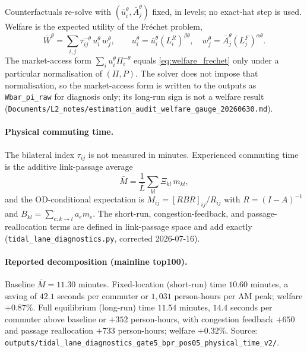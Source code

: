 \documentclass[11pt]{article}
\newcommand{\Lbar}{\bar L}
\newcommand{\Wbar}{\bar W}
\newcommand{\ubar}{\bar u}
\newcommand{\Abar}{\bar A}
\begin{document}
Counterfactuals re-solve with $(\ubar_i^{\theta},\Abar_j^{\theta})$
fixed, in levels; no exact-hat step is used.  Welfare is the expected
utility of the Fr\'echet problem,
\begin{equation}\label{eq:welfare_frechet}
  \Wbar^{\theta} = \sum_{i,j}\tau_{ij}^{-\theta}\,u_i^{\theta}\,w_j^{\theta},
  \qquad
  u_i^{\theta} = \ubar_i^{\theta}(L_i^R)^{\beta\theta},\quad
  w_j^{\theta} = \Abar_j^{\theta}(L_j^F)^{\alpha\theta}.
\end{equation}
The market-access form $\sum_i u_i^{\theta}\Pi_i^{-\theta}$ equals
\eqref{eq:welfare_frechet} only under a particular normalisation of
$(\Pi,P)$. The solver does not impose that normalisation, so the
market-access form is written to the outputs as \texttt{Wbar\_pi\_raw} for
diagnosis only; its long-run sign is not a welfare result
(\texttt{Documents/L2\_notes/estimation\_audit\_welfare\_gauge\_20260630.md}).

\paragraph{Physical commuting time.}
The bilateral index $\tau_{ij}$ is not measured in minutes. Experienced
commuting time is the additive link-passage average
\begin{equation}\label{eq:Mbar}
  \bar M = \frac{1}{\Lbar}\sum_{kl}\Xi_{kl}\,m_{kl},
\end{equation}
and the OD-conditional expectation is $M_{ij}=[RBR]_{ij}/R_{ij}$ with
$R=(I-A)^{-1}$ and $B_{kl}=\sum_{e:k\to l}a_e m_e$. The short-run,
congestion-feedback, and passage-reallocation terms are defined in
link-passage space and add exactly (\texttt{tidal\_lane\_diagnostics.py},
corrected 2026-07-16).

\paragraph{Reported decomposition (mainline top100).}
Baseline $\bar M=11.30$ minutes. Fixed-location (short-run) time
$10.60$ minutes, a saving of $42.1$ seconds per commuter or $1{,}031$
person-hours per AM peak; welfare $+0.87\%$. Full equilibrium (long-run)
time $11.54$ minutes, $14.4$ seconds per commuter above baseline or
$+352$ person-hours, with congestion feedback $+650$ and passage
reallocation $+733$ person-hours; welfare $+0.32\%$. Source:
\texttt{outputs/tidal\_lane\_diagnostics\_gate5\_bpr\_pos05\_physical\_time\_v2/}.
\end{document}

